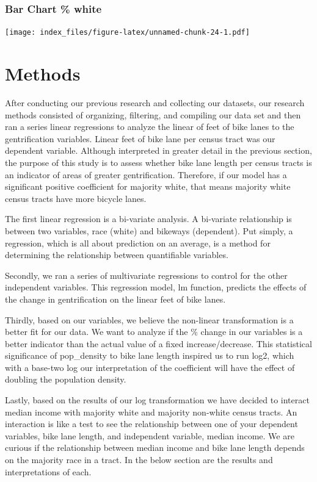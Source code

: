 \documentclass[
]{article}
\begin{document}
\hypertarget{bar-chart-white}{%
\subsubsection{Bar Chart \% white}\label{bar-chart-white}}

\texttt{[image: index\_files/figure-latex/unnamed-chunk-24-1.pdf]}

\hypertarget{methods}{%
\section{Methods}\label{methods}}

After conducting our previous research and collecting our datasets, our
research methods consisted of organizing, filtering, and compiling our
data set and then ran a series linear regressions to analyze the linear
of feet of bike lanes to the gentrification variables. Linear feet of
bike lane per census tract was our dependent variable. Although
interpreted in greater detail in the previous section, the purpose of
this study is to assess whether bike lane length per census tracts is an
indicator of areas of greater gentrification. Therefore, if our model
has a significant positive coefficient for majority white, that means
majority white census tracts have more bicycle lanes.

The first linear regression is a bi-variate analysis. A bi-variate
relationship is between two variables, race (white) and bikeways
(dependent). Put simply, a regression, which is all about prediction on
an average, is a method for determining the relationship between
quantifiable variables.

Secondly, we ran a series of multivariate regressions to control for the
other independent variables. This regression model, lm function,
predicts the effects of the change in gentrification on the linear feet
of bike lanes.

Thirdly, based on our variables, we believe the non-linear
transformation is a better fit for our data. We want to analyze if the
\% change in our variables is a better indicator than the actual value
of a fixed increase/decrease. This statistical significance of
pop\_density to bike lane length inspired us to run log2, which with a
base-two log our interpretation of the coefficient will have the effect
of doubling the population density.

Lastly, based on the results of our log transformation we have decided
to interact median income with majority white and majority non-white
census tracts. An interaction is like a test to see the relationship
between one of your dependent variables, bike lane length, and
independent variable, median income. We are curious if the relationship
between median income and bike lane length depends on the majority race
in a tract. In the below section are the results and interpretations of
each.
\end{document}
